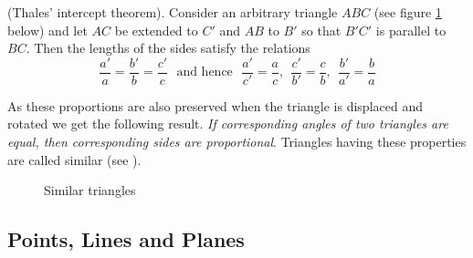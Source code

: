 \begin{theorem}
(Thales’ intercept theorem). Consider an arbitrary triangle $ABC$ (see figure \ref{geo:similar-triangles} below) and let $AC$  be extended to $C'$ and $AB$ to $B'$ so that $B'C'$ is parallel to $BC$. Then the lengths of the sides satisfy the relations
\[
\frac{a'}{a} = \frac{b'}{b} = \frac{c'}{c}
\textrm{~ and hence ~}
\frac{a'}{c'} = \frac{a}{c},~~
\frac{c'}{b'} = \frac{c}{b},~~
\frac{b'}{a'} = \frac{b}{a}
\]

\end{theorem}
As these proportions are also preserved when the triangle is displaced and rotated we get the following result. \textit{If corresponding angles of two triangles are equal, then corresponding sides are proportional}. Triangles having these properties are called similar (see ).
\begin{figure}[H]
\label{geo:similar-triangles}
\centering
{}
\caption{Similar triangles}
\end{figure}

\subsection{Points, Lines and Planes}

